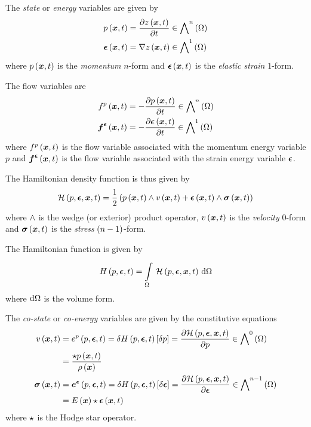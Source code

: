 The \emph{state} or \emph{energy} variables are given by
\begin{align}
    \fnof{p}{\vectr{x},t}&=\delby{\fnof{z}{\vectr{x},t}}{t}\in\diffformspace{n}{\Omega} \\
    \fnof{\vectr{\epsilon}}{\vectr{x},t}&=\gradient{}{\fnof{z}{\vectr{x},t}}\in\diffformspace{1}{\Omega}
\end{align}
where $ p\left(  \boldsymbol{x} ,t \right) $ is the \emph{momentum} $n$-form and
$  \boldsymbol{\epsilon} \left(  \boldsymbol{x} ,t \right) $ is the \emph{elastic
strain} $1$-form.

The flow variables are 
\begin{align}
  \fnof{f^{p}}{\vectr{x},t}&=-\delby{\fnof{p}{\vectr{x},t}}{t}\in\diffformspace{n}{\Omega} \\
  \fnof{\vectr{f}^{\vectr{\epsilon}}}{\vectr{x},t}&=-\delby{\fnof{\vectr{\epsilon}}{\vectr{x},t}}{t}\in\diffformspace{1}{\Omega}
\end{align}
where $ f^{p}\left(  \boldsymbol{x} ,t \right) $ is the flow variable associated with the momentum energy variable $p$ and $  \boldsymbol{f} ^{ \boldsymbol{\epsilon} }\left(  \boldsymbol{x} ,t \right) $ is the flow variable associated with the strain energy variable $ \boldsymbol{\epsilon} $.

The Hamiltonian density function is thus given by
\begin{equation}
     \mathcal{H} \left( p, \boldsymbol{\epsilon} , \boldsymbol{x} ,t \right)  =\dfrac{1}{2}\left(   p\left(  \boldsymbol{x} ,t \right)  \wedge  v\left(  \boldsymbol{x} ,t \right)  +   \boldsymbol{\epsilon} \left(  \boldsymbol{x} ,t \right)  \wedge   \boldsymbol{\sigma} \left(  \boldsymbol{x} ,t \right)   \right)
\end{equation}
where $ \wedge $ is the wedge (or exterior) product operator,
$ v\left(  \boldsymbol{x} ,t \right) $ is the \emph{velocity} $0$-form and
$  \boldsymbol{\sigma} \left(  \boldsymbol{x} ,t \right) $ is the \emph{stress}
$\left( n-1 \right)$-form.

The Hamiltonian function is given by
\begin{equation}
  \hamiltonian{p,\vectr{\epsilon},t}=\gint{\Omega}{}{\hamiltoniandensity{p,\vectr{\epsilon},\vectr{x},t}}{\Omega}
\end{equation}
where $  { \mathrm{d} }\Omega  $ is the volume form.

The \emph{co-state} or \emph{co-energy} variables are given by the constitutive equations
\begin{align}
  \fnof{v}{\vectr{x},t}&=\fnof{e^{p}}{p,\vectr{\epsilon},t}=\variation{\hamiltonian{p,\vectr{\epsilon},t}}{p}=\delby{\hamiltoniandensity{p,\vectr{\epsilon},\vectr{x},t}}{p}\in\diffformspace{0}{\Omega}\\
  &=\dfrac{\hodgestar{\fnof{p}{\vectr{x},t}}}{\fnof{\rho}{\vectr{x}}}\\
  \fnof{\tensor{\sigma}}{\vectr{x},t}&=\fnof{\vectr{e}^{\vectr{\epsilon}}}{p,\vectr{\epsilon},t}=\variation{\hamiltonian{p,\vectr{\epsilon},t}}{\vectr{\epsilon}}=\delby{\hamiltoniandensity{p,\vectr{\epsilon},\vectr{x},t}}{\vectr{\epsilon}}\in\diffformspace{n-1}{\Omega}\\
  &=\fnof{E}{\vectr{x}}\hodgestar{\fnof{\vectr{\epsilon}}{\vectr{x},t}}
\end{align}
where $ \star $ is the Hodge star operator.


